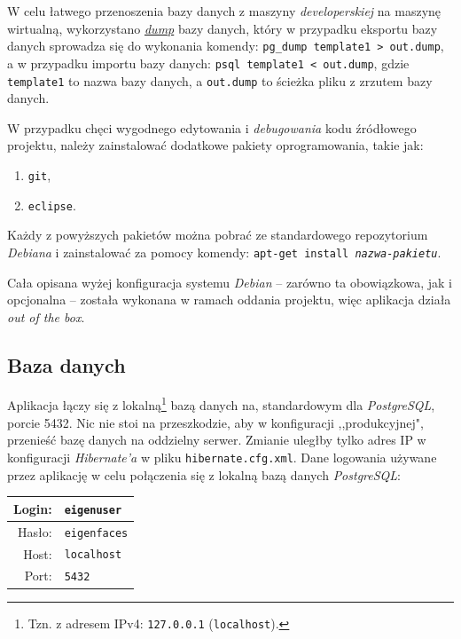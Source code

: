 \documentclass[a4paper,titlepage]{article}
\theoremstyle{break}
\numberwithin{equation}{subsection}
\begin{document}
W celu łatwego przenoszenia bazy danych z maszyny \emph{developerskiej} na maszynę wirtualną, wykorzystano \href{https://en.wikipedia.org/wiki/Database_dump}{\emph{dump}} bazy danych, który w przypadku eksportu bazy danych sprowadza się do wykonania komendy: \texttt{pg\_dump template1 > out.dump}, a w przypadku importu bazy danych: \texttt{psql template1 < out.dump}, gdzie \texttt{template1} to nazwa bazy danych, a \texttt{out.dump} to ścieżka pliku z zrzutem bazy danych.

W przypadku chęci wygodnego edytowania i \emph{debugowania} kodu źródłowego projektu, należy zainstalować dodatkowe pakiety oprogramowania, takie jak:
\begin{enumerate}
	\item \texttt{git},
	\item \texttt{eclipse}.
\end{enumerate}
Każdy z powyższych pakietów można pobrać ze standardowego repozytorium \emph{Debiana} i zainstalować za pomocy komendy: \texttt{apt-get install \emph{nazwa-pakietu}}.

Cała opisana wyżej konfiguracja systemu \emph{Debian} -- zarówno ta obowiązkowa, jak i opcjonalna -- została wykonana w ramach oddania projektu, więc aplikacja działa \emph{out of the box}.


\subsection{Baza danych}

Aplikacja łączy się z lokalną\footnote{Tzn. z adresem IPv4: \texttt{127.0.0.1} (\texttt{localhost}).} bazą danych na, standardowym dla \emph{PostgreSQL}, porcie 5432. Nic nie stoi na przeszkodzie, aby w konfiguracji ,,produkcyjnej", przenieść bazę danych na oddzielny serwer. Zmianie uległby tylko adres IP w konfiguracji \emph{Hibernate'a} w pliku \texttt{hibernate.cfg.xml}. Dane logowania używane przez aplikację w celu połączenia się z lokalną bazą danych \emph{PostgreSQL}:

\begin{tabular}{r|l}
Login: & \texttt{eigenuser}\\
\hline
Hasło: & \texttt{eigenfaces}\\
\hline
Host: & \texttt{localhost}\\
\hline
Port: & \texttt{5432}\\
\end{tabular}
\end{document}
